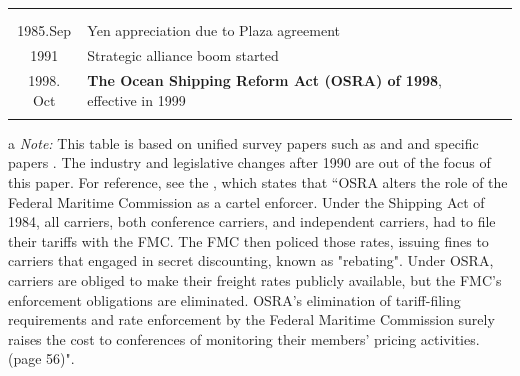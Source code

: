 \documentclass[11pt]{article}
\begin{document}
\begin{table}[ht!]
\begin{tabular}{cll}
      & &\cite{wilson1991some}\\
      & &\cite{pirrong1992application}\\
      1985.Sep&Yen appreciation due to Plaza agreement&\\\hline
      1991 & Strategic alliance boom started &\\
      1998. Oct  & \textbf{The Ocean Shipping Reform Act (OSRA) of 1998}, effective in 1999 &\cite{reitzes2002rolling}\\
      &&\cite{fusillo2006some,fusillo2013stability}\\\hline
    \end{tabular}
    \begin{tablenotes}
\item[a]\textit{Note:} This table is based on unified survey papers such as \cite{sjostrom2004ocean,sjostrom2013competition} and \cite{martin2012market} and specific papers \citep{clyde1995effectiveness,clyde1998market}. The industry and legislative changes after 1990 are out of the focus of this paper. For reference, see the \cite{reitzes2002rolling}, which states that ``OSRA alters the role of the Federal Maritime Commission as a cartel enforcer. Under the Shipping Act of 1984, all carriers, both conference carriers, and independent carriers, had to file their tariffs with the FMC. The FMC then policed those rates, issuing fines to carriers that engaged in secret discounting, known as "rebating". Under OSRA, carriers are obliged to make their freight rates publicly available, but the FMC's enforcement obligations are eliminated. OSRA's elimination of tariff-filing requirements and rate enforcement by the Federal Maritime Commission surely raises the cost to conferences of monitoring their members' pricing activities. (page 56)".
   \end{tablenotes}
\end{table}
\end{document}

